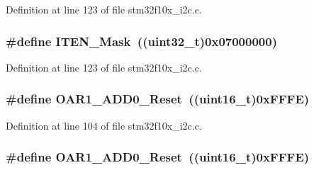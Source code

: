 Definition at line 123 of file stm32f10x\+\_\+i2c.\+c.

\subsubsection[{\texorpdfstring{I\+T\+E\+N\+\_\+\+Mask}{ITEN_Mask}}]{\setlength{\rightskip}{0pt plus 5cm}\#define I\+T\+E\+N\+\_\+\+Mask~(({\bf uint32\+\_\+t})0x07000000)}\hypertarget{group___i2_c___private___defines_gab99e12994e073c2a681a6cf68492b3e2}{}\label{group___i2_c___private___defines_gab99e12994e073c2a681a6cf68492b3e2}


Definition at line 123 of file stm32f10x\+\_\+i2c.\+c.

\subsubsection[{\texorpdfstring{O\+A\+R1\+\_\+\+A\+D\+D0\+\_\+\+Reset}{OAR1_ADD0_Reset}}]{\setlength{\rightskip}{0pt plus 5cm}\#define O\+A\+R1\+\_\+\+A\+D\+D0\+\_\+\+Reset~(({\bf uint16\+\_\+t})0x\+F\+F\+F\+E)}\hypertarget{group___i2_c___private___defines_gac5c2ac4577b70e1d7618b7fa1d715e3a}{}\label{group___i2_c___private___defines_gac5c2ac4577b70e1d7618b7fa1d715e3a}


Definition at line 104 of file stm32f10x\+\_\+i2c.\+c.

\subsubsection[{\texorpdfstring{O\+A\+R1\+\_\+\+A\+D\+D0\+\_\+\+Reset}{OAR1_ADD0_Reset}}]{\setlength{\rightskip}{0pt plus 5cm}\#define O\+A\+R1\+\_\+\+A\+D\+D0\+\_\+\+Reset~(({\bf uint16\+\_\+t})0x\+F\+F\+F\+E)}\hypertarget{group___i2_c___private___defines_gac5c2ac4577b70e1d7618b7fa1d715e3a}{}\label{group___i2_c___private___defines_gac5c2ac4577b70e1d7618b7fa1d715e3a}


